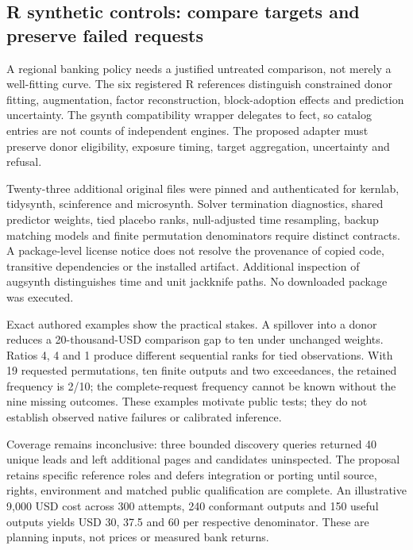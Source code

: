 \hypertarget{r-synthetic-controls-compare-targets-and-preserve-failed-requests}{%
\subsection{R synthetic controls: compare targets and preserve failed
requests}\label{r-synthetic-controls-compare-targets-and-preserve-failed-requests}}

A regional banking policy needs a justified untreated comparison, not
merely a well-fitting curve. The six registered R references distinguish
constrained donor fitting, augmentation, factor reconstruction,
block-adoption effects and prediction uncertainty. The gsynth
compatibility wrapper delegates to fect, so catalog entries are not
counts of independent engines. The proposed adapter must preserve donor
eligibility, exposure timing, target aggregation, uncertainty and
refusal.
\citep{exec24_synth_source,exec24_augsynth_source,exec24_scpi_source,exec24_fect_source,exec21_gsynth_wrapper,exec23_synthdid_reuse_source}

Twenty-three additional original files were pinned and authenticated for
kernlab, tidysynth, scinference and microsynth. Solver termination
diagnostics, shared predictor weights, tied placebo ranks, null-adjusted
time resampling, backup matching models and finite permutation
denominators require distinct contracts. A package-level license notice
does not resolve the provenance of copied code, transitive dependencies
or the installed artifact. Additional inspection of augsynth
distinguishes time and unit jackknife paths. No downloaded package was
executed.
\citep{exec25_synthr_kernlab,exec25_synthr_tidysynth,exec25_synthr_scinference,exec25_synthr_microsynth,exec25_synthr_auginference}

Exact authored examples show the practical stakes. A spillover into a
donor reduces a 20-thousand-USD comparison gap to ten under unchanged
weights. Ratios 4, 4 and 1 produce different sequential ranks for tied
observations. With 19 requested permutations, ten finite outputs and two
exceedances, the retained frequency is 2/10; the complete-request
frequency cannot be known without the nine missing outcomes. These
examples motivate public tests; they do not establish observed native
failures or calibrated inference. \citep{exec25_synthr_choice}

Coverage remains inconclusive: three bounded discovery queries returned
40 unique leads and left additional pages and candidates uninspected.
The proposal retains specific reference roles and defers integration or
porting until source, rights, environment and matched public
qualification are complete. An illustrative 9,000 USD cost across 300
attempts, 240 conformant outputs and 150 useful outputs yields USD 30,
37.5 and 60 per respective denominator. These are planning inputs, not
prices or measured bank returns. \citep{exec25_synthr_choice}

